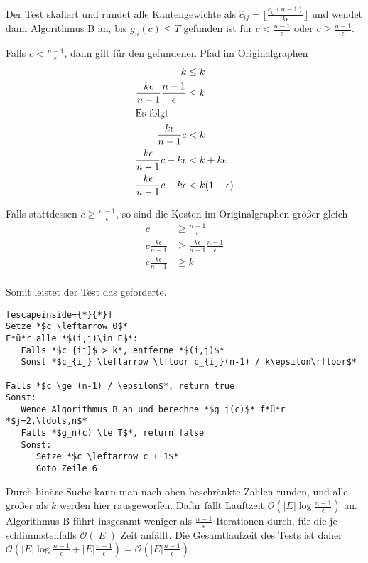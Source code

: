 \documentclass{article}
\begin{document}
Der Test skaliert und rundet alle Kantengewichte als $\hat{c}_{ij} =
\lfloor\frac{c_{ij} (n-1)}{k\epsilon}\rfloor$ und wendet dann Algorithmus B an,
bis $g_n(c) \le T$ gefunden ist für $c < \frac{n-1}{\epsilon}$ oder $c \ge
\frac{n-1}{\epsilon}$.

Falls $c < \frac{n-1}{\epsilon}$, dann gilt für den gefundenen Pfad im
Originalgraphen
\begin{align*}
   k & \le k \\
   \frac{k\epsilon}{n-1} \frac{n-1}{\epsilon} & \le k \\
   \intertext{Es folgt}
   \frac{k\epsilon}{n-1} c & < k \\
   \frac{k\epsilon}{n-1} c + k\epsilon& < k + k\epsilon\\
   \frac{k\epsilon}{n-1} c + k\epsilon& < k(1+\epsilon)\\
\end{align*}

Falls stattdessen $c \ge \frac{n-1}{\epsilon}$, so sind die Kosten im
Originalgraphen größer gleich
\begin{align*}
   c & \ge \frac{n-1}{\epsilon} \\
   c \frac{k\epsilon}{n-1} & \ge \frac{k\epsilon}{n-1}\frac{n-1}{\epsilon} \\
   c \frac{k\epsilon}{n-1} & \ge k \\
\end{align*}

Somit leistet der Test das geforderte.
\begin{lstlisting}[escapeinside={*}{*}]
Setze *$c \leftarrow 0$*
F*ü*r alle *$(i,j)\in E$*:
   Falls *$c_{ij}$ > k*, entferne *$(i,j)$*
   Sonst *$c_{ij} \leftarrow \lfloor c_{ij}(n-1) / k\epsilon\rfloor$*

Falls *$c \ge (n-1) / \epsilon$*, return true
Sonst: 
   Wende Algorithmus B an und berechne *$g_j(c)$* f*ü*r *$j=2,\ldots,n$*
   Falls *$g_n(c) \le T$*, return false
   Sonst:
      Setze *$c \leftarrow c + 1$*
      Goto Zeile 6
\end{lstlisting}
 Durch binäre Suche kann man nach oben beschränkte Zahlen runden, und alle
 größer als $k$ werden hier rausgeworfen. Dafür fällt Lauftzeit
 $\mathcal{O}(|E|\log{\frac{n-1}{\epsilon}})$ an. Algorithmus B führt insgesamt
 weniger als $\frac{n-1}{\epsilon}$ Iterationen durch, für die je
 schlimmstenfalls $\mathcal{O}(|E|)$ Zeit anfällt. Die Gesamtlaufzeit des Tests
 ist daher $\mathcal{O}(|E|\log{\frac{n-1}{\epsilon}} + |E|\frac{n-1}{\epsilon})
 = \mathcal{O}(|E|\frac{n-1}{\epsilon})
$
\end{document}
